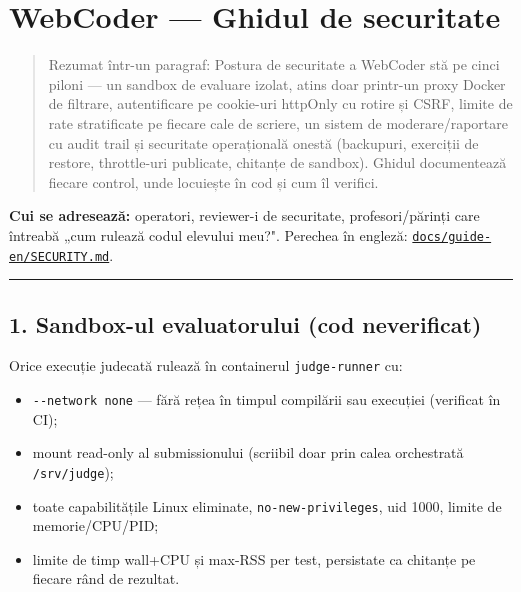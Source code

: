 \documentclass[
]{article}
\author{}
\date{}
\newcounter{none} %
\providecommand{\tightlist}{%
  \setlength{\itemsep}{0pt}\setlength{\parskip}{0pt}}
\begin{document}
{
\setcounter{tocdepth}{2}
\tableofcontents
}
\section{WebCoder --- Ghidul de
securitate}\label{webcoder--ghidul-de-securitate}

\begin{quote}
Rezumat într-un paragraf: Postura de securitate a WebCoder stă pe cinci
piloni --- un sandbox de evaluare izolat, atins doar printr-un proxy
Docker de filtrare, autentificare pe cookie-uri httpOnly cu rotire și
CSRF, limite de rate stratificate pe fiecare cale de scriere, un sistem
de moderare/raportare cu audit trail și securitate operațională onestă
(backupuri, exerciții de restore, throttle-uri publicate, chitanțe de
sandbox). Ghidul documentează fiecare control, unde locuiește în cod și
cum îl verifici.
\end{quote}

\textbf{Cui se adresează:} operatori, reviewer-i de securitate,
profesori/părinți care întreabă „cum rulează codul elevului meu?".
Perechea în engleză:
\href{../guide-en/SECURITY.md}{\texttt{docs/guide-en/SECURITY.md}}.

\begin{center}\rule{0.5\linewidth}{0.5pt}\end{center}

\subsection{1. Sandbox-ul evaluatorului (cod
neverificat)}\label{1-sandbox-ul-evaluatorului-cod-neverificat}

Orice execuție judecată rulează în containerul \texttt{judge-runner} cu:

\begin{itemize}
\tightlist
\item
  \texttt{-\/-network\ none} --- fără rețea în timpul compilării sau
  execuției (verificat în CI);
\item
  mount read-only al submissionului (scriibil doar prin calea
  orchestrată \texttt{/srv/judge});
\item
  toate capabilitățile Linux eliminate, \texttt{no-new-privileges}, uid
  1000, limite de memorie/CPU/PID;
\item
  limite de timp wall+CPU și max-RSS per test, persistate ca chitanțe pe
  fiecare rând de rezultat.
\end{itemize}
\end{document}
